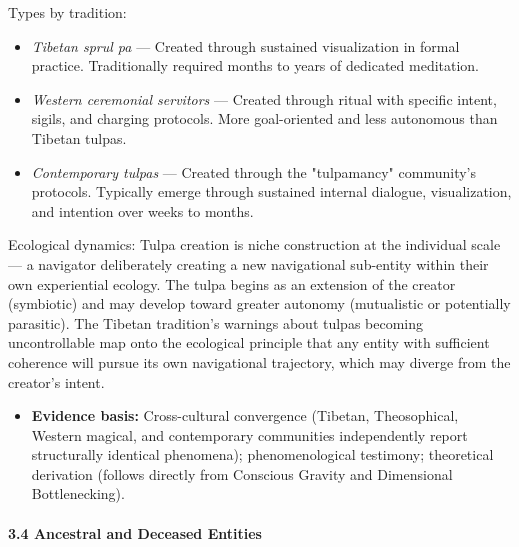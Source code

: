 Types by tradition:

\begin{itemize}[nosep,leftmargin=*]
  \item \textit{Tibetan sprul pa} — Created through sustained visualization in formal practice. Traditionally required months to years of dedicated meditation.
  \item \textit{Western ceremonial servitors} — Created through ritual with specific intent, sigils, and charging protocols. More goal-oriented and less autonomous than Tibetan tulpas.
  \item \textit{Contemporary tulpas} — Created through the "tulpamancy" community's protocols. Typically emerge through sustained internal dialogue, visualization, and intention over weeks to months.
\end{itemize}


Ecological dynamics: Tulpa creation is niche construction at the individual scale — a navigator deliberately creating a new navigational sub-entity within their own experiential ecology. The tulpa begins as an extension of the creator (symbiotic) and may develop toward greater autonomy (mutualistic or potentially parasitic). The Tibetan tradition's warnings about tulpas becoming uncontrollable map onto the ecological principle that any entity with sufficient coherence will pursue its own navigational trajectory, which may diverge from the creator's intent.


\begin{itemize}[nosep,leftmargin=*]
  \item \textbf{Evidence basis:} Cross-cultural convergence (Tibetan, Theosophical, Western magical, and contemporary communities independently report structurally identical phenomena); phenomenological testimony; theoretical derivation (follows directly from Conscious Gravity and Dimensional Bottlenecking).
\end{itemize}


\paragraph*{3.4 Ancestral and Deceased Entities}

